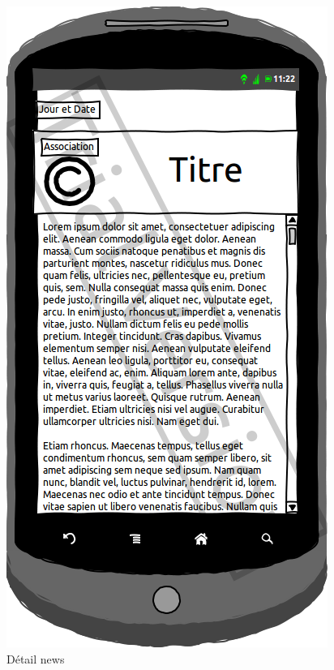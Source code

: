 \documentclass[a4paper, 11pt]{article}
\begin{document}
\begin{figure}[h!]
\begin{minipage}[c]{.50\linewidth}
\begin{center}
			\includegraphics[scale=0.3]{../../Sketch/Android/DescrNews.png}
		\end{center}
	\caption{Détail news}
	\end{minipage}
\end{figure}
\vfill
\clearpage
\end{document}
